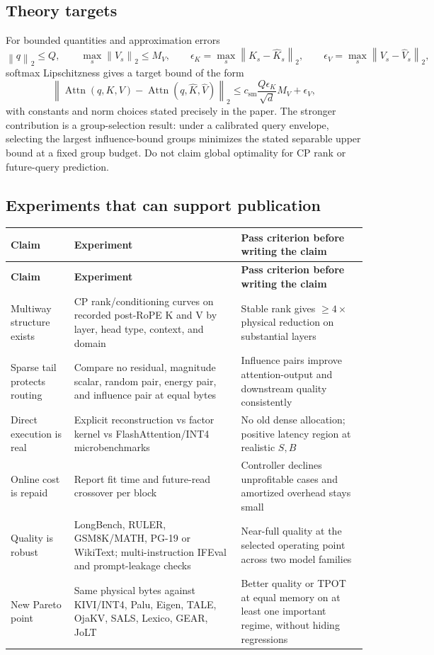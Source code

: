 \documentclass[10pt]{article}
\newcommand{\norm}[1]{\left\lVert #1\right\rVert}
\newcommand{\Attn}{\operatorname{Attn}}
\begin{document}
\subsection{Theory targets}

For bounded quantities and approximation errors
\[
\norm{q}_2\le Q,\qquad \max_s\norm{V_s}_2\le M_V,\qquad
\epsilon_K=\max_s\norm{K_s-\widehat K_s}_2,\qquad
\epsilon_V=\max_s\norm{V_s-\widehat V_s}_2,
\]
softmax Lipschitzness gives a target bound of the form
\[
\norm{\Attn(q,K,V)-\Attn(q,\widehat K,\widehat V)}_2
\le c_{\mathrm{sm}}\frac{Q\epsilon_K}{\sqrt d}M_V+\epsilon_V ,
\]
with constants and norm choices stated precisely in the paper. The stronger contribution is a
group-selection result: under a calibrated query envelope, selecting the largest influence-bound
groups minimizes the stated separable upper bound at a fixed group budget. Do not claim global
optimality for CP rank or future-query prediction.

\subsection{Experiments that can support publication}

\small
\renewcommand{\arraystretch}{1.16}
\begin{longtable}{@{}P{2.6cm}P{8.35cm}P{3.1cm}@{}}
\toprule
\textbf{Claim} & \textbf{Experiment} & \textbf{Pass criterion before writing the claim} \\
\midrule
\endfirsthead
\toprule
\textbf{Claim} & \textbf{Experiment} & \textbf{Pass criterion before writing the claim} \\
\midrule
\endhead
Multiway structure exists & CP rank/conditioning curves on recorded post-RoPE K and V by layer,
head type, context, and domain & Stable rank gives $\ge4\times$ physical reduction on substantial
layers \\
Sparse tail protects routing & Compare no residual, magnitude scalar, random pair, energy pair,
and influence pair at equal bytes & Influence pairs improve attention-output and downstream
quality consistently \\
Direct execution is real & Explicit reconstruction vs factor kernel vs FlashAttention/INT4
microbenchmarks & No old dense allocation; positive latency region at realistic $S,B$ \\
Online cost is repaid & Report fit time and future-read crossover per block & Controller declines
unprofitable cases and amortized overhead stays small \\
Quality is robust & LongBench, RULER, GSM8K/MATH, PG-19 or WikiText; multi-instruction IFEval and
prompt-leakage checks & Near-full quality at the selected operating point across two model families \\
New Pareto point & Same physical bytes against KIVI/INT4, Palu, Eigen, TALE, OjaKV, SALS,
Lexico, GEAR, JoLT & Better quality or TPOT at equal memory on at least one important regime,
without hiding regressions \\
\bottomrule
\end{longtable}
\normalsize
\end{document}

